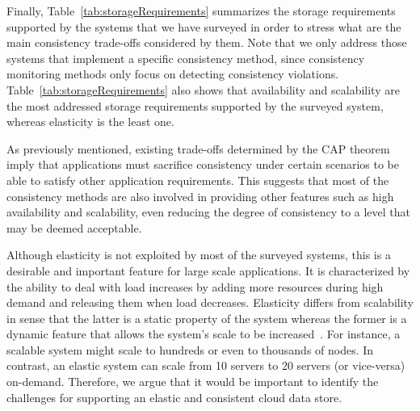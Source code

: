 Finally, Table~\ref{tab:storageRequirements} summarizes the storage requirements supported by the systems that we have surveyed in order to stress what are the main consistency trade-offs considered by them. Note that we only address those systems that implement %
a specific consistency method, since consistency monitoring methods only focus on detecting consistency violations. 
Table~\ref{tab:storageRequirements} also shows that availability and scalability are the most addressed storage requirements supported by the surveyed system, whereas elasticity is the least one. 

As previously mentioned, existing trade-offs determined by the CAP theorem imply that applications must sacrifice consistency under certain scenarios to be able to satisfy other application requirements. This suggests that most of the consistency methods are also involved in providing other features such as high availability and scalability, even reducing the degree of consistency to a level that may be deemed acceptable.

Although elasticity is not exploited by most of the surveyed systems, this is a desirable and important feature for large scale applications. It is characterized by the ability to deal with load increases by adding more resources during high demand and releasing them when load decreases. {\rc Elasticity differs from scalability in sense that the latter is a static property of the system whereas the former is a dynamic feature that allows the system’s scale to be increased~\cite{agrawal2011database}. For instance, a scalable system might scale to hundreds or even to thousands of nodes. In contrast, an elastic system can scale from 10 servers to 20 servers (or vice-versa) on-demand.}
Therefore, we argue that it would be important to identify the challenges for supporting an elastic and consistent cloud data store.
\vspace{1.6mm}
